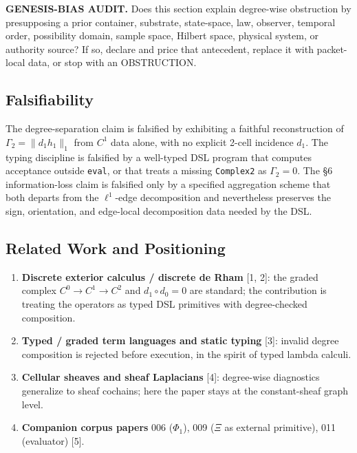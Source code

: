 \documentclass[
]{article}
\providecommand{\tightlist}{%
  \setlength{\itemsep}{0pt}\setlength{\parskip}{0pt}}
\providecommand{\tightlist}{%
  \setlength{\itemsep}{0pt}\setlength{\parskip}{0pt}}
\renewenvironment{quote}
  {\begin{leftbar}\small}
  {\end{leftbar}}
\begin{document}
\begin{quote}
\textbf{GENESIS-BIAS AUDIT.} Does this section explain degree-wise obstruction by presupposing a prior container, substrate, state-space, law, observer, temporal order, possibility domain, sample space, Hilbert space, physical system, or authority source? If so, declare and price that antecedent, replace it with packet-local data, or stop with an OBSTRUCTION.
\end{quote}

\subsection{Falsifiability}\label{falsifiability}

The degree-separation claim is falsified by exhibiting a faithful reconstruction of \(\Gamma_2=\|d_1 h_1\|_1\) from \(C^1\) data alone, with no explicit 2-cell incidence \(d_1\). The typing discipline is falsified by a well-typed DSL program that computes acceptance outside \texttt{eval}, or that treats a missing \texttt{Complex2} as \(\Gamma_2=0\). The §6 information-loss claim is falsified only by a specified aggregation scheme that both departs from the \(\ell^1\)-edge decomposition and nevertheless preserves the sign, orientation, and edge-local decomposition data needed by the DSL.

\subsection{Related Work and Positioning}\label{related-work-and-positioning}

\begin{enumerate}
\def\labelenumi{\arabic{enumi}.}
\tightlist
\item
  \textbf{Discrete exterior calculus / discrete de Rham} {[}1, 2{]}: the graded complex \(C^0\to C^1\to C^2\) and \(d_1\circ d_0=0\) are standard; the contribution is treating the operators as typed DSL primitives with degree-checked composition.
\item
  \textbf{Typed / graded term languages and static typing} {[}3{]}: invalid degree composition is rejected before execution, in the spirit of typed lambda calculi.
\item
  \textbf{Cellular sheaves and sheaf Laplacians} {[}4{]}: degree-wise diagnostics generalize to sheaf cochains; here the paper stays at the constant-sheaf graph level.
\item
  \textbf{Companion corpus papers} 006 (\(\Phi_1\)), 009 (\(\Xi\) as external primitive), 011 (evaluator) {[}5{]}.
\end{enumerate}
\end{document}
